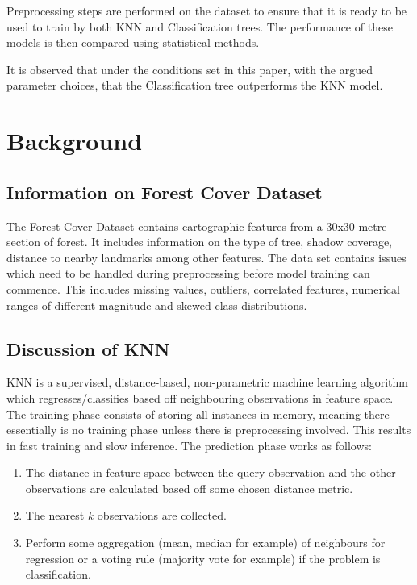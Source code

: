 \documentclass[conference]{IEEEtran}
\begin{document}
Preprocessing steps are performed on the dataset to ensure that it is ready to be used to train by both KNN and Classification trees. The performance of these models is then compared using statistical methods.

It is observed that under the conditions set in this paper, with the argued parameter choices, that the Classification tree outperforms the KNN model.


\section{Background}

\subsection{Information on Forest Cover Dataset}

The Forest Cover Dataset contains cartographic features from a 30x30 metre section of forest. It includes information on the type of tree, shadow coverage, distance to nearby landmarks among other features. The data set contains issues which need to be handled during preprocessing before model training can commence. This includes missing values, outliers, correlated features, numerical ranges of different magnitude and skewed class distributions.

\subsection{Discussion of KNN}

KNN is a supervised, distance-based, non-parametric machine learning algorithm which regresses/classifies based off neighbouring observations in feature space. The training phase consists of storing all instances in memory\cite[p.~187]{fundamentals}, meaning there essentially is no training phase unless there is preprocessing involved. This results in fast training and slow inference. The prediction phase works as follows: 

\begin{enumerate}
	\item The distance in feature space between the query observation and the other observations are calculated based off some chosen distance metric.
	\item The nearest $k$ observations are collected.
	\item Perform some aggregation (mean, median for example) of neighbours for regression or a voting rule (majority vote \cite[p.~192]{fundamentals} for example) if the problem is classification.
\end{enumerate}
\end{document}
